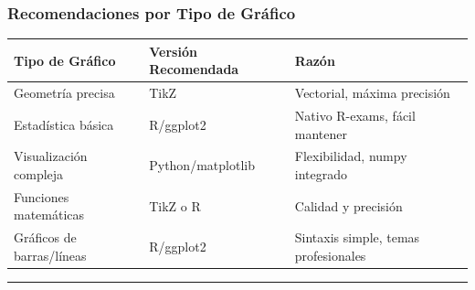 \documentclass[
]{article}
\begin{document}
\subsubsection{Recomendaciones por Tipo de
Gráfico}\label{recomendaciones-por-tipo-de-gruxe1fico}

\begin{longtable}[]{@{}
  >{\raggedright\arraybackslash}p{}
  >{\raggedright\arraybackslash}p{}
  >{\raggedright\arraybackslash}p{}@{}}
\toprule\noalign{}
\begin{minipage}[b]{\linewidth}\raggedright
Tipo de Gráfico
\end{minipage} & \begin{minipage}[b]{\linewidth}\raggedright
Versión Recomendada
\end{minipage} & \begin{minipage}[b]{\linewidth}\raggedright
Razón
\end{minipage} \\
\midrule\noalign{}
\endhead
\bottomrule\noalign{}
\endlastfoot
Geometría precisa & TikZ & Vectorial, máxima precisión \\
Estadística básica & R/ggplot2 & Nativo R-exams, fácil mantener \\
Visualización compleja & Python/matplotlib & Flexibilidad, numpy
integrado \\
Funciones matemáticas & TikZ o R & Calidad y precisión \\
Gráficos de barras/líneas & R/ggplot2 & Sintaxis simple, temas
profesionales \\
\end{longtable}

\begin{center}\rule{0.5\linewidth}{0.5pt}\end{center}
\end{document}
